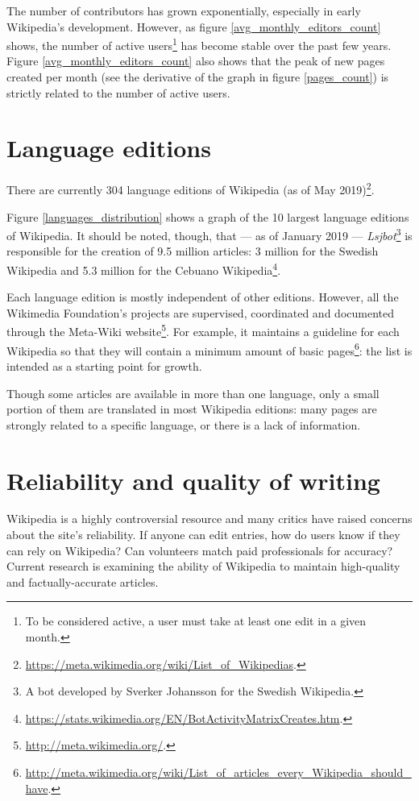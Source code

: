         The number of contributors has grown exponentially, especially in early Wikipedia's development. However, as figure \ref{avg_monthly_editors_count} shows, the number of active users\footnote{To be considered active, a user must take at least one edit in a given month.} has become stable over the past few years. Figure \ref{avg_monthly_editors_count} also shows that the peak of new pages created per month (see the derivative of the graph in figure \ref{pages_count}) is strictly related to the number of active users.
        
        
    \section{Language editions}
        There are currently 304 language editions of Wikipedia (as of May 2019)\footnote{\url{https://meta.wikimedia.org/wiki/List_of_Wikipedias}.}.
        
        
        
        Figure \ref{languages_distribution} shows a graph of the 10 largest language editions of Wikipedia. It should be noted, though, that --- as of January 2019 --- \emph{Lsjbot}\footnote{A bot developed by Sverker Johansson for the Swedish Wikipedia.} is responsible for the creation of 9.5 million articles: 3 million for the Swedish Wikipedia and 5.3 million for the Cebuano Wikipedia\footnote{\url{https://stats.wikimedia.org/EN/BotActivityMatrixCreates.htm}.}. 
        
        Each language edition is mostly independent of other editions. However, all the Wikimedia Foundation's projects are supervised, coordinated and documented through the Meta-Wiki website\footnote{\url{http://meta.wikimedia.org/}.}. For example, it maintains a guideline for each Wikipedia so that they will contain a minimum amount of basic pages\footnote{\url{http://meta.wikimedia.org/wiki/List_of_articles_every_Wikipedia_should_have}.}: the list is intended as a starting point for growth.
        
        Though some articles are available in more than one language, only a small portion of them are translated in most Wikipedia editions: many pages are strongly related to a specific language, or there is a lack of information.
    \section{Reliability and quality of writing}
        Wikipedia is a highly controversial resource and many critics have raised concerns about the site's reliability. If anyone can edit entries, how do users know if they can rely on Wikipedia? Can volunteers match paid professionals for accuracy? Current research is examining the ability of Wikipedia to maintain high-quality and factually-accurate articles.
        
